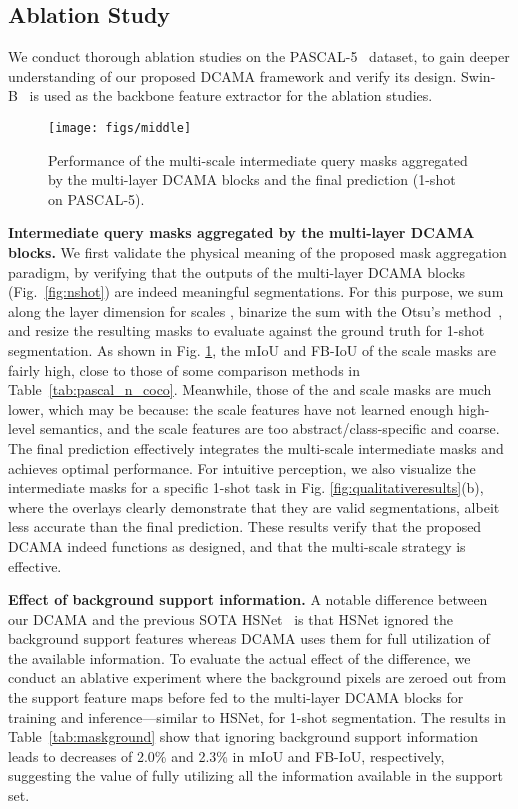 \documentclass[runningheads,table,xcdraw]{llncs}
\begin{document}
\subsection{Ablation Study}
We conduct thorough ablation studies on the PASCAL-5~\cite{shaban2017one} dataset, to gain deeper understanding of our proposed DCAMA framework and verify its design. {\color{blue}Swin-B~\cite{liu2021swin} is used as the backbone feature extractor for the ablation studies.}

\begin{figure}[t]
  \centering
   \texttt{[image: figs/middle]}
   \caption{Performance of the multi-scale intermediate query masks aggregated by the multi-layer DCAMA blocks and the final prediction (1-shot on PASCAL-5).}
   \label{fig:middle}
\end{figure}

\textbf{Intermediate query masks aggregated by the multi-layer DCAMA blocks.}
We first validate the physical meaning of the proposed mask aggregation paradigm, by verifying that the outputs of the multi-layer DCAMA blocks (Fig.~\ref{fig:nshot}) are indeed meaningful segmentations.
For this purpose, we sum  along the layer dimension for scales , binarize the sum with the Otsu's method~\cite{otsu1979threshold}, and resize the resulting masks to evaluate against the ground truth for 1-shot segmentation.
As shown in Fig. \ref{fig:middle}, the mIoU and FB-IoU of the  scale masks are fairly high, close to those of some comparison methods in Table~\ref{tab:pascal_n_coco}.
Meanwhile, those of the  and  scale masks are much lower, which may be because: the  scale features have not learned enough high-level semantics, and the  scale features are too abstract/class-specific and coarse.
The final prediction effectively integrates the multi-scale intermediate masks and achieves optimal performance.
For intuitive perception, we also visualize the intermediate masks for a specific 1-shot task in Fig. \ref{fig:qualitativeresults}(b), where the overlays clearly demonstrate that they are valid segmentations, albeit less accurate than the final prediction.
These results verify that the proposed DCAMA indeed functions as designed, and that the multi-scale strategy is effective.


\textbf{Effect of background support information.}
A notable difference between our DCAMA and the previous SOTA HSNet~\cite{min2021hypercorrelation} is that HSNet ignored the background support features whereas DCAMA uses them for full utilization of the available information.
To evaluate the actual effect of the difference, we conduct an ablative experiment where the background pixels are zeroed out from the support feature maps before fed to the multi-layer DCAMA blocks {\color{blue}for training and inference}---similar to HSNet, for 1-shot segmentation.
The results in Table~\ref{tab:maskground} show that ignoring background support information leads to decreases of 2.0\% and 2.3\% in mIoU and FB-IoU, respectively, suggesting the value of fully utilizing all the information available in the support set.
\end{document}
